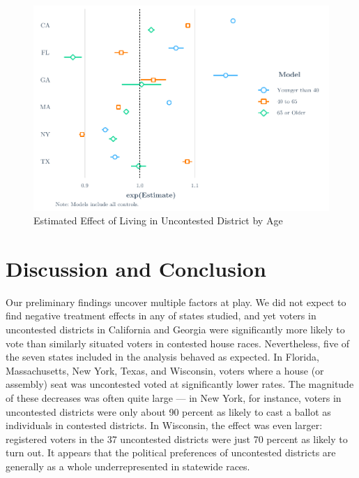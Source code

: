 \documentclass[
  12pt,
]{article}
\begin{document}
\begin{figure}[H]

{\centering \includegraphics{write_files/figure-latex/age-plots-1} 

}

\caption{\label{fig:ages}Estimated Effect of Living in Uncontested District by Age}\label{fig:age-plots}
\end{figure}

\hypertarget{discussion-and-conclusion}{%
\section*{Discussion and Conclusion}\label{discussion-and-conclusion}}

Our preliminary findings uncover multiple factors at play. We did not expect to find negative treatment effects in any of states studied, and yet voters in uncontested districts in California and Georgia were significantly more likely to vote than similarly situated voters in contested house races. Nevertheless, five of the seven states included in the analysis behaved as expected. In Florida, Massachusetts, New York, Texas, and Wisconsin, voters where a house (or assembly) seat was uncontested voted at significantly lower rates. The magnitude of these decreases was often quite large --- in New York, for instance, voters in uncontested districts were only about 90 percent as likely to cast a ballot as individuals in contested districts. In Wisconsin, the effect was even larger: registered voters in the 37 uncontested districts were just 70 percent as likely to turn out. It appears that the political preferences of uncontested districts are generally as a whole underrepresented in statewide races.
\end{document}
